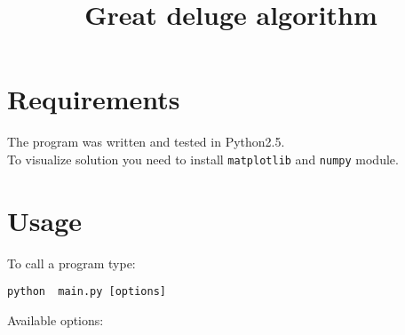 \documentclass{article}
\title{Great deluge algorithm}
\begin{document}
\maketitle 
\section{Requirements}
The program was written and tested in Python2.5.\\
To visualize solution you need to install {\tt{}matplotlib} and {\tt{}numpy} module.

\section{Usage}

To call a program type:
\begin{verbatim}python  main.py [options]\end{verbatim}

Available options:
\end{document}
